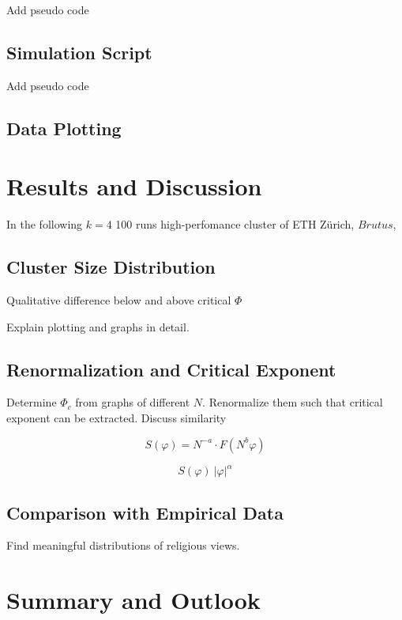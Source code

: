 \documentclass[11pt]{article}
\begin{document}
Add pseudo code

\subsection{Simulation Script}

Add pseudo code

\subsection{Data Plotting}

\section{Results and Discussion}

In the following $k = 4$ 
100 runs
high-perfomance cluster of ETH Zürich, $Brutus$,


\subsection{Cluster Size Distribution}

Qualitative difference below and above critical $\Phi$

Explain plotting and graphs in detail.

\subsection{Renormalization and Critical Exponent}

Determine $\Phi_c$ from graphs of different $N$. Renormalize them such that critical exponent can be extracted. Discuss similarity

\begin{equation}
S(\varphi) = N^{-a}\cdot F(N^b  \varphi)
\end{equation}

\begin{equation}
S(\varphi) ~ |\varphi|^\alpha
\end{equation}

\subsection{Comparison with Empirical Data}



Find meaningful distributions of religious views.

\section{Summary and Outlook}
\end{document}
